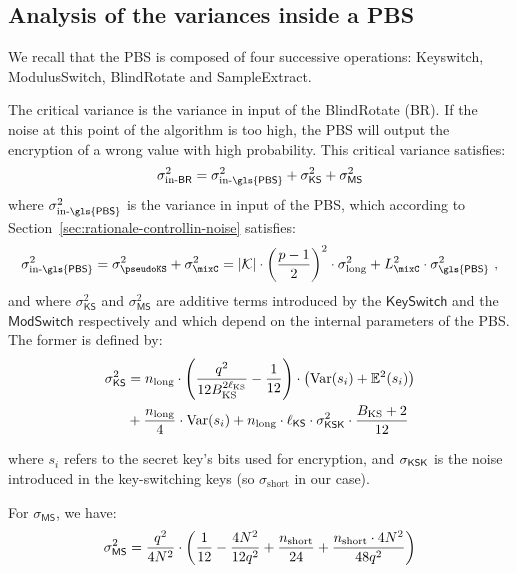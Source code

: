 \subsection{Analysis of the variances inside a \gls{PBS}}
\label{sec:pbs_variance_analysis}

We recall that the \gls{PBS} is composed of four successive operations: \textsf{Keyswitch}, \textsf{ModulusSwitch}, \textsf{BlindRotate} and \textsf{SampleExtract}.


The critical variance is the variance in input of the \textsf{BlindRotate} (\textsf{BR}). If the noise at this point of the algorithm is too high, the \gls{PBS} will output the encryption of a wrong value with high probability. This critical variance satisfies:
$$\sigma^2_{\text{in-}\textsf{BR}} = \sigma^2_{\text{in-}\textsf{\gls{PBS}}} + \sigma^2_{\textsf{KS}} + \sigma^2_{\textsf{MS}}$$
where $\sigma^2_{\text{in-}\textsf{\gls{PBS}}}$ is the variance in input of the \gls{PBS}, which according to Section~\ref{sec:rationale-controllin-noise} satisfies:
$$\sigma^2_{\text{in-}\textsf{\gls{PBS}}} = \sigma_\pseudoKS^2+\sigma^2_\mixC = 
|\mathcal{K}| \cdot \left(\frac{p-1}2\right)^2 \cdot \sigma_{\text{long}}^2 + L_\mixC^2 \cdot \sigma^2_{\textsf{\gls{PBS}}}~,$$
and where $\sigma^2_{\textsf{KS}}$ and $\sigma^2_{\textsf{MS}}$ are additive terms introduced by the $\textsf{KeySwitch}$ and the $\textsf{ModSwitch}$ respectively and which depend on the internal parameters of the \gls{PBS}. The former is defined by:
%
\begin{equation*}
	\begin{aligned}
		\sigma_{\sf{KS}}^2 & = n_{\text{long}} \cdot \left( \frac{q^2}{12B_{\text{KS}}^{2\ell_{\text{KS}}}} - \frac{1}{12} \right) \cdot \left( \text{Var}(s_i) + \mathbb{E}^2(s_i) \right) \\
		& + \frac{n_{\text{long}}}{4} \cdot \text{Var}(s_i) + n_{\text{long}} \cdot \ell_{\sf{KS}} \cdot \sigma_{\sf{KSK}}^2 \cdot \frac{B_{\text{KS}} + 2}{12}
	\end{aligned}
\end{equation*}

where $s_i$ refers to the secret key's bits used for encryption, and $\sigma_{\sf{KSK}}$ is the noise introduced in the key-switching keys (so $\sigma_{\text{short}}$ in our case).

For $\sigma_{\textsf{MS}}$, we have:
\begin{equation*}
	\sigma^2_{\sf{MS}} = \frac {q^2} {4 N^2} \cdot \left ( \frac{1}{12} - \frac{4N^2}{12 q^2} + \frac{n_{\text{short}}}{24} + \frac{n_{\text{short}} \cdot 4 N^2}{48 q^2} \right )
\end{equation*}

